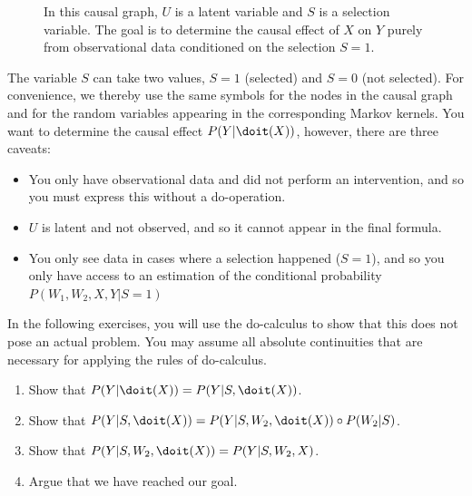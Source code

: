 \begin{enumerate}[label=8.\arabic*]
    \begin{figure}[!ht]
        \centering
        \caption{In this causal graph, $U$ is a latent variable and $S$ is a selection variable.
            The goal is to determine the causal effect of $X$ on $Y$ purely from observational data conditioned on the selection $S = 1$.}
        \label{fig:selection_effect}
    \end{figure}

    The variable $S$ can take two values, $S = 1$ (selected) and $S = 0$ (not selected).
    For convenience, we thereby use the same symbols for the nodes in the causal graph and for the random variables appearing in the corresponding Markov kernels.
    You want to determine the causal effect $P(Y | \doit(X))$, however, there are three caveats:
    \begin{itemize}
        \item You only have observational data and did not perform an intervention, and so you must express this without a do-operation.
        \item $U$ is latent and not observed, and so it cannot appear in the final formula.
        \item You only see data in cases where a selection happened ($S = 1$), and so you only have access to an estimation of the conditional probability $P(W_1, W_2, X, Y | S = 1)$
    \end{itemize}

    In the following exercises, you will use the do-calculus to show that this does not pose an actual problem. You may assume all absolute continuities that are necessary for applying the rules of do-calculus.

    \begin{enumerate}
        \item Show that $P(Y | \doit(X)) = P(Y | S, \doit(X))$.
        \item Show that $P(Y | S, \doit(X)) = P(Y | S, W_2, \doit(X)) \circ P(W_2 | S)$.
        \item Show that  $P(Y | S, W_2, \doit(X)) = P(Y | S, W_2, X)$.
        \item Argue that we have reached our goal.
    \end{enumerate}


\end{enumerate}
